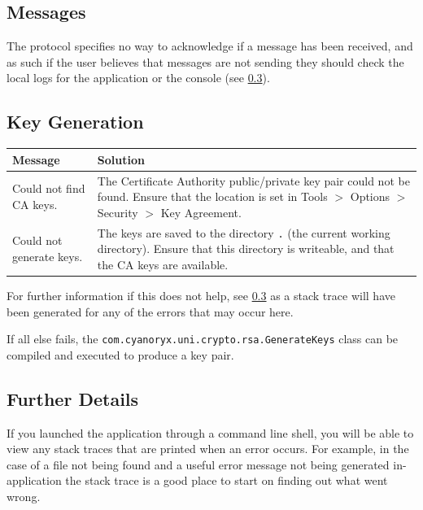 \subsection{Messages}

The protocol specifies no way to acknowledge if a message has been received, and as such if the user believes that messages are not sending they should check the local logs for the application or the console (see \textsection\ref{subsec:man_further_details}).

\subsection{Key Generation}

\begin{center}
  \begin{tabular}{|l|p{5.0cm}|}
    \hline
    \textbf{Message} & \textbf{Solution} \\ \hline \hline
    Could not find CA keys. & The Certificate Authority public/private key pair could not be found. Ensure that the location is set in Tools $>$ Options $>$ Security $>$ Key Agreement. \\ \hline
    Could not generate keys. & The keys are saved to the directory \verb!.! (the current working directory). Ensure that this directory is writeable, and that the CA keys are available. \\
    \hline
  \end{tabular}
\end{center}

For further information if this does not help, see \textsection\ref{subsec:man_further_details} as a stack trace will have been generated for any of the errors that may occur here.

If all else fails, the \verb!com.cyanoryx.uni.crypto.rsa.GenerateKeys! class can be compiled and executed to produce a key pair.

\subsection{Further Details}
\label{subsec:man_further_details}

If you launched the application through a command line shell, you will be able to view any stack traces that are printed when an error occurs. For example, in the case of a file not being found and a useful error message not being generated in-application the stack trace is a good place to start on finding out what went wrong.